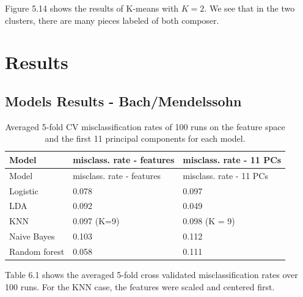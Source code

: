 \documentclass[12pt,twoside]{reedthesis}
\theoremstyle{definition}
\theoremstyle{definition}
\theoremstyle{definition}
\theoremstyle{remark}
\begin{document}
Figure 5.14 shows the results of K-means with \(K = 2\). We see that in
the two clusters, there are many pieces labeled of both composer.

\chapter{Results}\label{results}

\section{Models Results -
Bach/Mendelssohn}\label{models-results---bachmendelssohn}
\begin{longtable}[]{@{}lll@{}}
\caption{Averaged 5-fold CV misclassification rates of 100 runs on the
feature space and the first 11 principal components for each
model.}\tabularnewline
\toprule
Model & misclass. rate - features & misclass. rate - 11
PCs\tabularnewline
\midrule
\endfirsthead
\toprule
Model & misclass. rate - features & misclass. rate - 11
PCs\tabularnewline
\midrule
\endhead
Logistic & 0.078 & 0.097\tabularnewline
LDA & 0.092 & 0.049\tabularnewline
KNN & 0.097 (K=9) & 0.098 (K = 9)\tabularnewline
Naive Bayes & 0.103 & 0.112\tabularnewline
Random forest & 0.058 & 0.111\tabularnewline
\bottomrule
\end{longtable}
Table 6.1 shows the averaged 5-fold cross validated misclassification
rates over 100 runs. For the KNN case, the features were scaled and
centered first.
\end{document}
